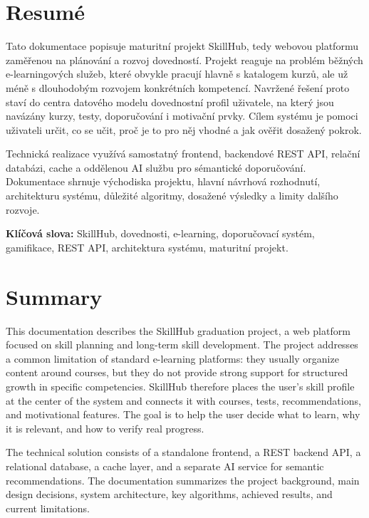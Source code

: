 \documentclass[12pt,a4paper]{report}
\begin{document}
\clearpage
\chapter*{Resumé}
Tato dokumentace popisuje maturitní projekt SkillHub, tedy webovou platformu zaměřenou na plánování a rozvoj dovedností. Projekt reaguje na problém běžných e-learningových služeb, které obvykle pracují hlavně s katalogem kurzů, ale už méně s dlouhodobým rozvojem konkrétních kompetencí. Navržené řešení proto staví do centra datového modelu dovednostní profil uživatele, na který jsou navázány kurzy, testy, doporučování i motivační prvky. Cílem systému je pomoci uživateli určit, co se učit, proč je to pro něj vhodné a jak ověřit dosažený pokrok.

Technická realizace využívá samostatný frontend, backendové REST API, relační databázi, cache a oddělenou AI službu pro sémantické doporučování. Dokumentace shrnuje východiska projektu, hlavní návrhová rozhodnutí, architekturu systému, důležité algoritmy, dosažené výsledky a limity dalšího rozvoje.

\vspace{0.7cm}
\noindent\textbf{Klíčová slova:} SkillHub, dovednosti, e-learning, doporučovací systém, gamifikace, REST API, architektura systému, maturitní projekt.

\clearpage
\chapter*{Summary}
This documentation describes the SkillHub graduation project, a web platform focused on skill planning and long-term skill development. The project addresses a common limitation of standard e-learning platforms: they usually organize content around courses, but they do not provide strong support for structured growth in specific competencies. SkillHub therefore places the user's skill profile at the center of the system and connects it with courses, tests, recommendations, and motivational features. The goal is to help the user decide what to learn, why it is relevant, and how to verify real progress.

The technical solution consists of a standalone frontend, a REST backend API, a relational database, a cache layer, and a separate AI service for semantic recommendations. The documentation summarizes the project background, main design decisions, system architecture, key algorithms, achieved results, and current limitations.
\end{document}
